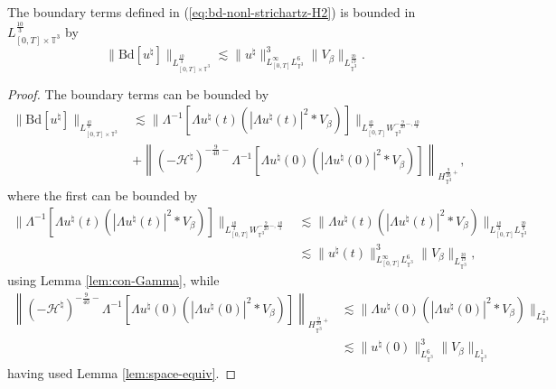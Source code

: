 \begin{lem}
  \label{append-lem-bound-boundary-H2}The boundary terms defined in
  (\ref{eq:bd-nonl-strichartz-H2}) is bounded in $L^{\frac{10}{3}}_{[0, T]
  \times \mathbb{T}^3}$ by
  \[ \| \mathrm{Bd} [u^{\natural}] \|_{L^{\frac{10}{3}}_{[0, T] \times
     \mathbb{T}^3}} \lesssim \| u^{\natural} \|^3_{L_{[0, T]}^{\infty}
     L_{\mathbb{T}^3}^6} \| V_{\beta} \|_{L_{\mathbb{T}^3}^{\frac{20}{19}}} .
  \]
\end{lem}

\begin{proof}
  The boundary terms can be bounded by
  \begin{align*}
    \| \mathrm{Bd} [u^{\natural}] \|_{L^{\frac{10}{3}}_{[0, T] \times
    \mathbb{T}^3}} & \lesssim \| \Lambda^{- 1} [\Lambda u^{\natural} (t) (|
    \Lambda u^{\natural} (t) |^2 \ast V_{\beta})] \|_{L_{[0,
    T]}^{\frac{10}{3}} {W_{\mathbb{T}^3}^{- \frac{9}{20} -, \frac{10}{3}}} }\\
    & + \left\| (- \mathcal{H}^{\natural})^{- \frac{9}{40} -} \Lambda^{- 1}
    [\Lambda u^{\natural} (0) (| \Lambda u^{\natural} (0) |^2 \ast V_{\beta})]
    \right\|_{H^{\frac{9}{20} +}_{\mathbb{T}^3}},
  \end{align*}
  where the first can be bounded by
  \begin{align*}
    \| \Lambda^{- 1} [\Lambda u^{\natural} (t) (| \Lambda u^{\natural} (t) |^2
    \ast V_{\beta})] \|_{L_{[0, T]}^{\frac{10}{3}} {W_{\mathbb{T}^3}^{-
    \frac{9}{20} -, \frac{10}{3}}} } & \lesssim \| \Lambda u^{\natural} (t)
    (| \Lambda u^{\natural} (t) |^2 \ast V_{\beta}) \|_{L_{[0,
    T]}^{\frac{10}{3}} {L_{\mathbb{T}^3}^{\frac{20}{9}}} }\\
    & \lesssim \| u^{\natural} (t) \|^3_{L_{[0, T]}^{\infty}
    L_{\mathbb{T}^3}^6} \| V_{\beta} \|_{L_{\mathbb{T}^3}^{\frac{20}{19}}},
  \end{align*}
  using Lemma \ref{lem:con-Gamma}, while
  \begin{align*}
    \left\| (- \mathcal{H}^{\natural})^{- \frac{9}{40} -} \Lambda^{- 1}
    [\Lambda u^{\natural} (0) (| \Lambda u^{\natural} (0) |^2 \ast V_{\beta})]
    \right\|_{H^{\frac{9}{20} +}_{\mathbb{T}^3}} & \lesssim \| \Lambda
    u^{\natural} (0) (| \Lambda u^{\natural} (0) |^2 \ast V_{\beta})
    \|_{L_{\mathbb{T}^3}^2}\\
    & \lesssim \| u^{\natural} (0) \|^3_{L_{\mathbb{T}^3}^6} \| V_{\beta}
    \|_{L_{\mathbb{T}^3}^1}
  \end{align*}
  having used Lemma \ref{lem:space-equiv}. 
\end{proof}
